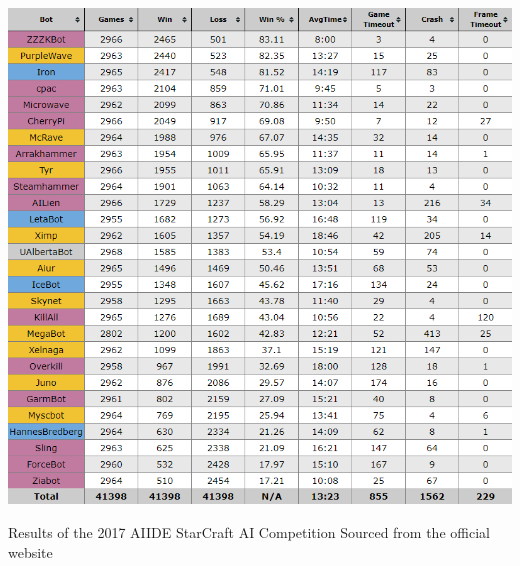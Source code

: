 \documentclass[journal]{IEEEtran}
\begin{document}
\begin{table}
	\centering
	\includegraphics[width=\textwidth]{2017}
	\caption{Results of the 2017 AIIDE StarCraft AI Competition Sourced from the official website \cite{Results}}
	\label{table2}
\end{table}


\end{document}

